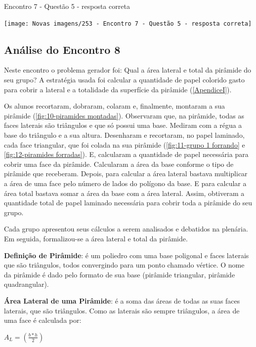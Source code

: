 \begin{CenteredFigure}
    \caption{Encontro 7 - Questão 5 - resposta correta} \label{fig: 253 - Encontro 7 - Questao 5 - resposta correta}
    \texttt{[image: Novas imagens/253 - Encontro 7 - Questão 5 - resposta correta]}
    \legend{\autoria}
\end{CenteredFigure}

\subsection{Análise do Encontro 8}

Neste encontro o problema gerador foi: Qual a área lateral e total da pirâmide do seu grupo? A estratégia usada foi calcular a quantidade de papel colorido gasto para cobrir a lateral e a totalidade da superfície da pirâmide (\autoref{ApendiceI}).

Os alunos recortaram, dobraram, colaram e, finalmente, montaram a sua pirâmide (\autoref{fig:10-piramides montadas}). Observaram que, na pirâmide, todas as faces laterais são triângulos e que só possui uma base. Mediram com a régua a base do triângulo e a sua altura. Desenharam e recortaram, no papel laminado, cada face triangular, que foi colada na sua pirâmide (\autoref{fig:11-grupo 1 forrando} e \autoref{fig:12-piramides forradas}).  E, calcularam a quantidade de papel necessária para cobrir uma face da pirâmide. Calcularam a área da base conforme o tipo de pirâmide que receberam. Depois, para calcular a área lateral bastava multiplicar a área de uma face pelo número de lados do polígono da base. E para calcular a área total bastava somar a área da base com a área lateral. Assim, obtiveram a quantidade total de papel laminado necessária para cobrir toda a pirâmide do seu grupo.

Cada grupo apresentou seus cálculos a serem analisados e debatidos na plenária. Em seguida, formalizou-se a área lateral e total da pirâmide.

\textbf{Definição de Pirâmide}: é um poliedro com uma base poligonal e faces laterais que são triângulos, todos convergindo para um ponto chamado vértice. O nome da pirâmide é dado pelo formato de sua base (pirâmide triangular, pirâmide quadrangular).

\textbf{Área Lateral de uma Pirâmide}: é a soma das áreas de todas as suas faces laterais, que são triângulos. Como as laterais são sempre triângulos, a área de uma face é calculada por:

\textcolor[HTML]{0000FF}{$A_L = \left( \frac{b*h}{2}  \right)$}


